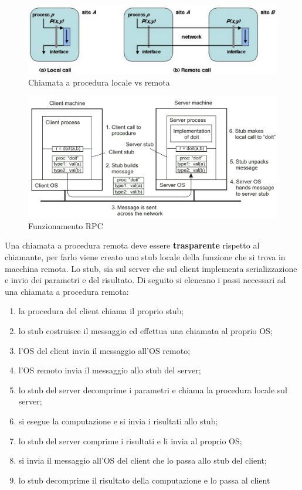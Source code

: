 \documentclass[12pt]{article}
\begin{document}
		\begin{figure}[h!]
			\centering
			\includegraphics[scale=0.50]{img/proc.png}
			\caption{Chiamata a procedura locale vs remota}
		\end{figure}
		\begin{figure}[h!]
			\centering
			\includegraphics[scale=0.50]{img/how.png}
			\caption{Funzionamento RPC}
		\end{figure}
		Una chiamata a procedura remota deve essere \textbf{trasparente} rispetto al chiamante, per farlo viene creato uno stub locale della funzione che si trova in macchina remota. Lo stub, sia sul server che sul client implementa serializzazione e invio dei parametri e del risultato.  
		Di seguito si elencano i passi necessari ad una chiamata a procedura remota:
		\begin{enumerate}
			\item la procedura del client chiama il proprio stub;
			\item lo stub costruisce il messaggio ed effettua una chiamata al proprio OS;
			\item l'OS del client invia il messaggio all'OS remoto;
			\item l'OS remoto invia il messaggio allo stub del server;
			\item lo stub del server decomprime i parametri e chiama la procedura locale sul server;
			\item si esegue la computazione e si invia i risultati allo stub; 
			\item lo stub del server comprime i risultati e li invia al proprio OS;
			\item si invia il messaggio all'OS del client che lo passa allo stub del client;
			\item lo stub decomprime il risultato della computazione e lo passa al client
		\end{enumerate}
		
\end{document}
